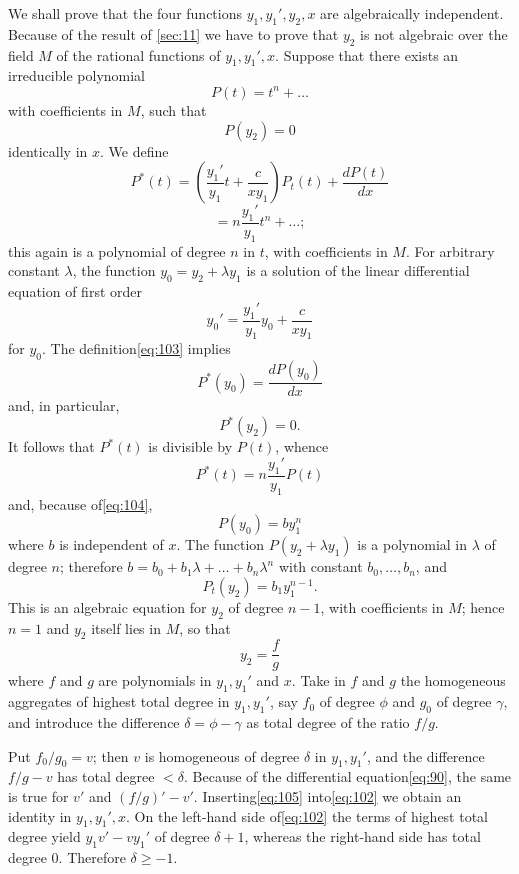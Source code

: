We shall prove that the four functions $y_1, y_1', y_2, x$ are algebraically independent. Because of the result of \autoref{sec:11} we have to prove that $y_2$ is not algebraic over the field $M$ of the rational functions of $y_1, y_1', x$. Suppose that there exists an irreducible polynomial
\[P(t) = t^n + \dots\]
with coefficients in $M$, such that
\[P(y_2) = 0\]
identically in $x$. We define
\begin{equation}
P^*(t) = \left(\frac{y_1'}{y_1} t + \frac{c}{x y_1}\right) P_t(t) + \frac{dP(t)}{dx} \tag{103}\label{eq:103}
\end{equation}
\[= n \frac{y_1'}{y_1} t^n + \dots;\]
this again is a polynomial of degree $n$ in $t$, with coefficients in $M$. For arbitrary constant $\lambda$, the function $y_0 = y_2 + \lambda y_1$ is a solution of the linear differential equation of first order
\[y_0' = \frac{y_1'}{y_1} y_0 + \frac{c}{x y_1}\]
for $y_0$. The definition\eqref{eq:103} implies
\begin{equation}
P^*(y_0) = \frac{dP(y_0)}{dx} \tag{104}\label{eq:104}
\end{equation}
and, in particular,
\[P^*(y_2) = 0.\]
It follows that $P^*(t)$ is divisible by $P(t)$, whence
\[P^*(t) = n \frac{y_1'}{y_1} P(t)\]
and, because of\eqref{eq:104},
\begin{equation}
P(y_0) = b y_1^n \tag{105}\label{eq:105}
\end{equation}
where $b$ is independent of $x$. The function $P(y_2 + \lambda y_1)$ is a polynomial in $\lambda$ of degree $n$; therefore $b = b_0 + b_1 \lambda + \dots + b_n \lambda^n$ with constant $b_0, \dots, b_n$, and
\[P_t(y_2) = b_1 y_1^{n-1}.\]
This is an algebraic equation for $y_2$ of degree $n-1$, with coefficients in $M$; hence $n=1$ and $y_2$ itself lies in $M$, so that
\[y_2 = \frac{f}{g}\]
where $f$ and $g$ are polynomials in $y_1, y_1'$ and $x$. Take in $f$ and $g$ the homogeneous aggregates of highest total degree in $y_1, y_1'$, say $f_0$ of degree $\phi$ and $g_0$ of degree $\gamma$, and introduce the difference $\delta = \phi - \gamma$ as total degree of the ratio $f/g$.

Put $f_0/g_0 = v$; then $v$ is homogeneous of degree $\delta$ in $y_1, y_1'$, and the difference $f/g - v$ has total degree $< \delta$. Because of the differential equation\eqref{eq:90}, the same is true for $v'$ and $(f/g)' - v'$. Inserting\eqref{eq:105} into\eqref{eq:102} we obtain an identity in $y_1, y_1', x$. On the left-hand side of\eqref{eq:102} the terms of highest total degree yield $y_1 v' - v y_1'$ of degree $\delta + 1$, whereas the right-hand side has total degree 0. Therefore $\delta \ge -1$.

